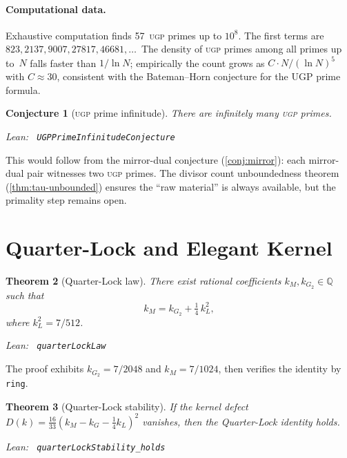 \documentclass[11pt,a4paper]{article}
\newenvironment{leanref}%
  {\par\smallskip\noindent\begingroup\raggedright\textup{Lean:}~}%
  {\par\endgroup}
\newtheorem{theorem}{Theorem}[section]
\newtheorem{conjecture}[theorem]{Conjecture}
\theoremstyle{definition}
\newcommand{\ugp}{\textsc{ugp}}
\newcommand{\Q}{\mathbb{Q}}
\begin{document}
\paragraph{Computational data.}
Exhaustive computation finds 57~\ugp{} primes up to $10^8$.  The first
terms are $823, 2137, 9007, 27817, 46681, \ldots$\
The density of \ugp{} primes among all primes up to~$N$ falls faster
than $1/\ln N$; empirically the count grows as $C \cdot N / (\ln N)^5$
with $C \approx 30$, consistent with the Bateman--Horn conjecture for the
UGP prime formula.

\begin{conjecture}[\ugp{} prime infinitude]\label{conj:ugp-inf}
There are infinitely many \ugp{} primes.

\begin{leanref} \lstinline|UGPPrimeInfinitudeConjecture|
\end{leanref}
\end{conjecture}

This would follow from the mirror-dual conjecture
(\cref{conj:mirror}): each mirror-dual pair witnesses two \ugp{} primes.
The divisor count unboundedness theorem (\cref{thm:tau-unbounded})
ensures the ``raw material'' is always available, but the primality
step remains open.

\section{Quarter-Lock and Elegant Kernel}\label{sec:quarterlock}

\begin{theorem}[Quarter-Lock law]\label{thm:ql}
There exist rational coefficients $k_M, k_{G_2} \in \Q$ such that
\[
  k_M = k_{G_2} + \tfrac{1}{4}\, k_{L}^2,
\]
where $k_L^2 = 7/512$.

\begin{leanref} \lstinline|quarterLockLaw|
\end{leanref}
\end{theorem}

The proof exhibits $k_{G_2} = 7/2048$ and $k_M = 7/1024$, then
verifies the identity by \texttt{ring}.

\begin{theorem}[Quarter-Lock stability]\label{thm:ql-stab}
If the kernel defect $D(k) = \frac{16}{33}(k_M - k_G -
\frac{1}{4} k_L)^2$ vanishes, then the Quarter-Lock identity holds.

\begin{leanref} \lstinline|quarterLockStability_holds|
\end{leanref}
\end{theorem}
\end{document}
